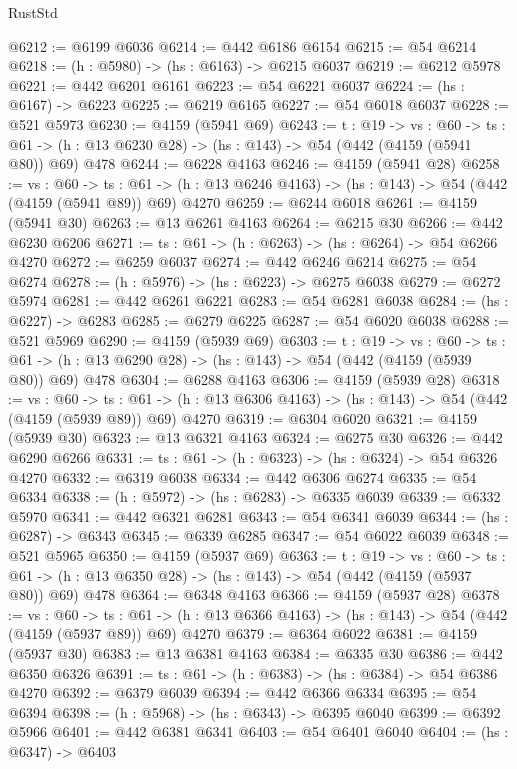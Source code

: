\begin{lexlean}{RustStd}
\begin{coremodule}
@6212 := @6199 @6036
@6214 := @442 @6186 @6154
@6215 := @54 @6214
@6218 := (h : @5980) -> (hs : @6163) -> @6215 @6037
@6219 := @6212 @5978
@6221 := @442 @6201 @6161
@6223 := @54 @6221 @6037
@6224 := (hs : @6167) -> @6223
@6225 := @6219 @6165
@6227 := @54 @6018 @6037
@6228 := @521 @5973
@6230 := @4159 (@5941 @69)
@6243 := {t : @19} ->
  {vs : @60} ->
  {ts : @61} -> (h : @13 @6230 @28) -> (hs : @143) -> @54 (@442 (@4159 (@5941 @80)) @69) @478
@6244 := @6228 @4163
@6246 := @4159 (@5941 @28)
@6258 := {vs : @60} ->
  {ts : @61} -> (h : @13 @6246 @4163) -> (hs : @143) -> @54 (@442 (@4159 (@5941 @89)) @69) @4270
@6259 := @6244 @6018
@6261 := @4159 (@5941 @30)
@6263 := @13 @6261 @4163
@6264 := @6215 @30
@6266 := @442 @6230 @6206
@6271 := {ts : @61} -> (h : @6263) -> (hs : @6264) -> @54 @6266 @4270
@6272 := @6259 @6037
@6274 := @442 @6246 @6214
@6275 := @54 @6274
@6278 := (h : @5976) -> (hs : @6223) -> @6275 @6038
@6279 := @6272 @5974
@6281 := @442 @6261 @6221
@6283 := @54 @6281 @6038
@6284 := (hs : @6227) -> @6283
@6285 := @6279 @6225
@6287 := @54 @6020 @6038
@6288 := @521 @5969
@6290 := @4159 (@5939 @69)
@6303 := {t : @19} ->
  {vs : @60} ->
  {ts : @61} -> (h : @13 @6290 @28) -> (hs : @143) -> @54 (@442 (@4159 (@5939 @80)) @69) @478
@6304 := @6288 @4163
@6306 := @4159 (@5939 @28)
@6318 := {vs : @60} ->
  {ts : @61} -> (h : @13 @6306 @4163) -> (hs : @143) -> @54 (@442 (@4159 (@5939 @89)) @69) @4270
@6319 := @6304 @6020
@6321 := @4159 (@5939 @30)
@6323 := @13 @6321 @4163
@6324 := @6275 @30
@6326 := @442 @6290 @6266
@6331 := {ts : @61} -> (h : @6323) -> (hs : @6324) -> @54 @6326 @4270
@6332 := @6319 @6038
@6334 := @442 @6306 @6274
@6335 := @54 @6334
@6338 := (h : @5972) -> (hs : @6283) -> @6335 @6039
@6339 := @6332 @5970
@6341 := @442 @6321 @6281
@6343 := @54 @6341 @6039
@6344 := (hs : @6287) -> @6343
@6345 := @6339 @6285
@6347 := @54 @6022 @6039
@6348 := @521 @5965
@6350 := @4159 (@5937 @69)
@6363 := {t : @19} ->
  {vs : @60} ->
  {ts : @61} -> (h : @13 @6350 @28) -> (hs : @143) -> @54 (@442 (@4159 (@5937 @80)) @69) @478
@6364 := @6348 @4163
@6366 := @4159 (@5937 @28)
@6378 := {vs : @60} ->
  {ts : @61} -> (h : @13 @6366 @4163) -> (hs : @143) -> @54 (@442 (@4159 (@5937 @89)) @69) @4270
@6379 := @6364 @6022
@6381 := @4159 (@5937 @30)
@6383 := @13 @6381 @4163
@6384 := @6335 @30
@6386 := @442 @6350 @6326
@6391 := {ts : @61} -> (h : @6383) -> (hs : @6384) -> @54 @6386 @4270
@6392 := @6379 @6039
@6394 := @442 @6366 @6334
@6395 := @54 @6394
@6398 := (h : @5968) -> (hs : @6343) -> @6395 @6040
@6399 := @6392 @5966
@6401 := @442 @6381 @6341
@6403 := @54 @6401 @6040
@6404 := (hs : @6347) -> @6403

\end{coremodule}
\end{lexlean}
